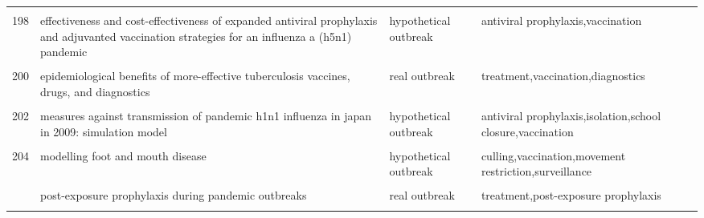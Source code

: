 \documentclass[
]{article}
\begin{document}
\begin{landscape}
\begin{longtable}{l>{\raggedright\arraybackslash}p{3cm}l>{\raggedright\arraybackslash}p{8cm}}
\cellcolor{gray!6}{197} & \cellcolor{gray!6}{economic evaluation of influenza pandemic mitigation strategies in the united states using a stochastic microsimulation transmission model} & \cellcolor{gray!6}{hypothetical outbreak} & \cellcolor{gray!6}{antiviral prophylaxis,distancing,vaccination}\\
198 & effectiveness and cost-effectiveness of expanded antiviral prophylaxis and adjuvanted vaccination strategies for an influenza a (h5n1) pandemic & hypothetical outbreak & antiviral prophylaxis,vaccination\\
\cellcolor{gray!6}{199} & \cellcolor{gray!6}{engineering responses to pandemics} & \cellcolor{gray!6}{real outbreak} & \cellcolor{gray!6}{behavioural change,travel restriction}\\
200 & epidemiological benefits of more-effective tuberculosis vaccines, drugs, and diagnostics & real outbreak & treatment,vaccination,diagnostics\\
\addlinespace
\cellcolor{gray!6}{201} & \cellcolor{gray!6}{household epidemics: modelling effects of early stage vaccination} & \cellcolor{gray!6}{hypothetical outbreak} & \cellcolor{gray!6}{vaccination}\\
202 & measures against transmission of pandemic h1n1 influenza in japan in 2009: simulation model & hypothetical outbreak & antiviral prophylaxis,isolation,school closure,vaccination\\
\cellcolor{gray!6}{203} & \cellcolor{gray!6}{modeling vaccination campaigns and the fall/winter 2009 activity of the new a(h1n1) influenza in the northern hemisphere} & \cellcolor{gray!6}{hypothetical outbreak} & \cellcolor{gray!6}{antiviral prophylaxis,vaccination}\\
204 & modelling foot and mouth disease & hypothetical outbreak & culling,vaccination,movement restriction,surveillance\\
\cellcolor{gray!6}{205} & \cellcolor{gray!6}{modelling of the influenza a(h1n1)v outbreak in mexico city, april-may 2009, with control sanitary measures} & \cellcolor{gray!6}{real outbreak} & \cellcolor{gray!6}{handwashing,sanitary measures}\\
\addlinespace
206 & post-exposure prophylaxis during pandemic outbreaks & real outbreak & treatment,post-exposure prophylaxis\\
\cellcolor{gray!6}{207} & \cellcolor{gray!6}{potential for a global dynamic of influenza a (h1n1)} & \cellcolor{gray!6}{hypothetical outbreak} & \cellcolor{gray!6}{vaccination}\\

\end{longtable}
\end{landscape}
\end{document}
